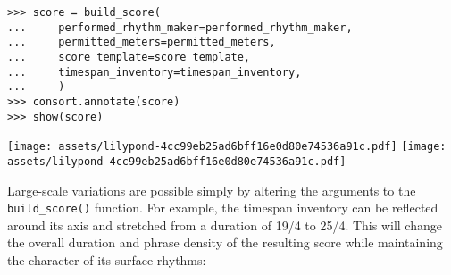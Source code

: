 \begin{abjadbookoutput}
\begin{singlespacing}
\vspace{-0.5\baselineskip}
\begin{lstlisting}
>>> score = build_score(
...     performed_rhythm_maker=performed_rhythm_maker,
...     permitted_meters=permitted_meters,
...     score_template=score_template,
...     timespan_inventory=timespan_inventory,
...     )
>>> consort.annotate(score)
>>> show(score)
\end{lstlisting}
\noindent\texttt{[image: assets/lilypond-4cc99eb25ad6bff16e0d80e74536a91c.pdf]}
\newline
\newline
\noindent\texttt{[image: assets/lilypond-4cc99eb25ad6bff16e0d80e74536a91c.pdf]}
\end{singlespacing}
\end{abjadbookoutput}

\noindent Large-scale variations are possible simply by altering the arguments
to the \texttt{build\_score()} function. For example, the timespan inventory
can be reflected around its axis and stretched from a duration of 19/4 to 25/4.
This will change the overall duration and phrase density of the resulting score
while maintaining the character of its surface rhythms:

\begin{comment}
<abjad>[stylesheet=../consort-small.ily]
multiplier = Duration(24, 4) / Duration(19, 4)
timespan_inventory = timespan_inventory.reflect()
timespan_inventory = timespan_inventory.stretch(multiplier)
timespan_inventory = timespan_inventory.round_offsets(Duration(1, 8))
show(timespan_inventory, key='voice_name')
score = build_score(
    performed_rhythm_maker=performed_rhythm_maker,
    permitted_meters=permitted_meters,
    score_template=score_template,
    timespan_inventory=timespan_inventory,
    )
consort.annotate(score)
show(score)
</abjad>
\end{comment}

